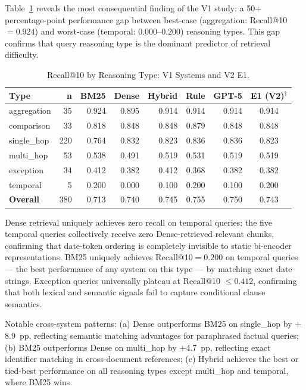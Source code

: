 \documentclass[11pt, a4paper]{article}
\begin{document}
Table~\ref{tab:by_type} reveals the most consequential finding of the V1 study: a 50+ percentage-point performance gap between best-case (aggregation: Recall@10$={0.924}$) and worst-case (temporal: $0.000$--$0.200$) reasoning types. This gap confirms that query reasoning type is the dominant predictor of retrieval difficulty.

\begin{table}[htbp]
\centering
\caption{Recall@10 by Reasoning Type: V1 Systems and V2 E1.}
\label{tab:by_type}
\begin{tabular}{lrrrrrr|c}
\toprule
\textbf{Type} & \textbf{n} & \textbf{BM25} & \textbf{Dense} & \textbf{Hybrid} & \textbf{Rule} & \textbf{GPT-5} & \textbf{E1 (V2)$^\dagger$} \\
\midrule
aggregation  & 35  & 0.924 & 0.895 & 0.914 & 0.914 & 0.914 & 0.914 \\
comparison   & 33  & 0.818 & 0.848 & 0.848 & 0.879 & 0.848 & 0.848 \\
single\_hop  & 220 & 0.764 & 0.832 & 0.823 & 0.836 & 0.836 & 0.823 \\
multi\_hop   & 53  & 0.538 & 0.491 & 0.519 & 0.531 & 0.519 & 0.519 \\
exception    & 34  & 0.412 & 0.382 & 0.412 & 0.368 & 0.382 & 0.382 \\
temporal     & 5   & 0.200 & 0.000 & 0.100 & 0.200 & 0.100 & 0.200 \\
\midrule
\textbf{Overall} & 380 & 0.713 & 0.740 & 0.745 & 0.755 & 0.750 & 0.743 \\
\bottomrule
\end{tabular}
\end{table}

\FloatBarrier

Dense retrieval uniquely achieves zero recall on temporal queries: the five temporal queries collectively receive zero Dense-retrieved relevant chunks, confirming that date-token ordering is completely invisible to static bi-encoder representations. BM25 uniquely achieves Recall@10$={0.200}$ on temporal queries --- the best performance of any system on this type --- by matching exact date strings. Exception queries universally plateau at Recall@10 $\leq 0.412$, confirming that both lexical and semantic signals fail to capture conditional clause semantics.

Notable cross-system patterns: (a) Dense outperforms BM25 on single\_hop by $+$8.9~pp, reflecting semantic matching advantages for paraphrased factual queries; (b) BM25 outperforms Dense on multi\_hop by $+$4.7~pp, reflecting exact identifier matching in cross-document references; (c) Hybrid achieves the best or tied-best performance on all reasoning types except multi\_hop and temporal, where BM25 wins.
\end{document}
